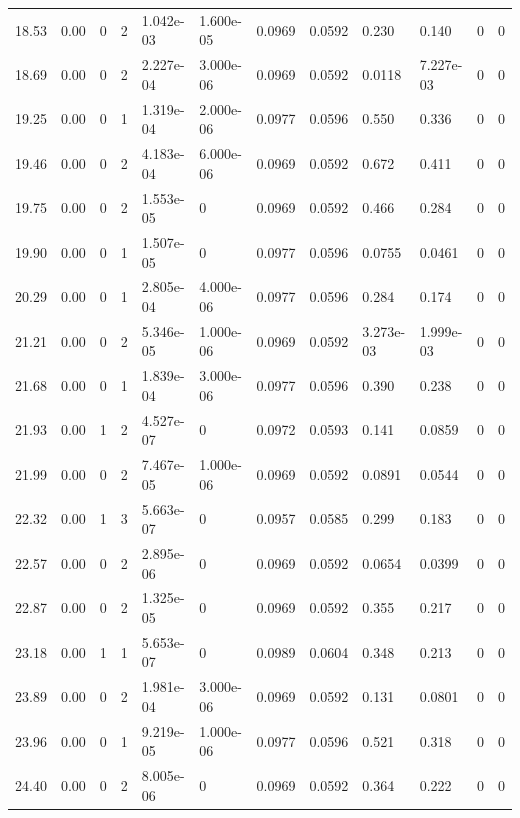 \documentclass[preview]{standalone}
\begin{document}
{{{\begin{tabular}{L{1.2cm}C{1.2cm} C{0.3cm}C{0.5cm} C{1.4cm}C{1.4cm} C{1.4cm}C{1.4cm} C{1.6cm}C{1.6cm} C{1.6cm}C{1.6cm}}
  18.53  &  0.00  & 0     &  2 &  1.042e-03  & 1.600e-05  &  0.0969&   0.0592& 0.230 & 0.140   &  0 & 0  \\ 
  18.69  &  0.00  & 0     &  2 &  2.227e-04  & 3.000e-06  &  0.0969&   0.0592& 0.0118 & 7.227e-03   &  0 & 0  \\ 
  19.25  &  0.00  & 0     &  1 &  1.319e-04  & 2.000e-06  &  0.0977&   0.0596& 0.550 & 0.336   &  0 & 0  \\ 
  19.46  &  0.00  & 0     &  2 &  4.183e-04  & 6.000e-06  &  0.0969&   0.0592& 0.672 & 0.411   &  0 & 0  \\ 
  19.75  &  0.00  & 0     &  2 &  1.553e-05  & 0  &  0.0969&   0.0592& 0.466 & 0.284   &  0 & 0  \\ 
  19.90  &  0.00  & 0     &  1 &  1.507e-05  & 0  &  0.0977&   0.0596& 0.0755 & 0.0461   &  0 & 0  \\ 
  20.29  &  0.00  & 0     &  1 &  2.805e-04  & 4.000e-06  &  0.0977&   0.0596& 0.284 & 0.174   &  0 & 0  \\ 
  21.21  &  0.00  & 0     &  2 &  5.346e-05  & 1.000e-06  &  0.0969&   0.0592& 3.273e-03 & 1.999e-03   &  0 & 0  \\ 
  21.68  &  0.00  & 0     &  1 &  1.839e-04  & 3.000e-06  &  0.0977&   0.0596& 0.390 & 0.238   &  0 & 0  \\ 
  21.93  &  0.00  & 1     &  2 &  4.527e-07  & 0  &  0.0972&   0.0593& 0.141 & 0.0859   &  0 & 0  \\ 
  21.99  &  0.00  & 0     &  2 &  7.467e-05  & 1.000e-06  &  0.0969&   0.0592& 0.0891 & 0.0544   &  0 & 0  \\ 
  22.32  &  0.00  & 1     &  3 &  5.663e-07  & 0  &  0.0957&   0.0585& 0.299 & 0.183   &  0 & 0  \\ 
  22.57  &  0.00  & 0     &  2 &  2.895e-06  & 0  &  0.0969&   0.0592& 0.0654 & 0.0399   &  0 & 0  \\ 
  22.87  &  0.00  & 0     &  2 &  1.325e-05  & 0  &  0.0969&   0.0592& 0.355 & 0.217   &  0 & 0  \\ 
  23.18  &  0.00  & 1     &  1 &  5.653e-07  & 0  &  0.0989&   0.0604& 0.348 & 0.213   &  0 & 0  \\ 
  23.89  &  0.00  & 0     &  2 &  1.981e-04  & 3.000e-06  &  0.0969&   0.0592& 0.131 & 0.0801   &  0 & 0  \\ 
  23.96  &  0.00  & 0     &  1 &  9.219e-05  & 1.000e-06  &  0.0977&   0.0596& 0.521 & 0.318   &  0 & 0  \\ 
  24.40  &  0.00  & 0     &  2 &  8.005e-06  & 0  &  0.0969&   0.0592& 0.364 & 0.222   &  0 & 0  \\ 

\end{tabular}}}}
\end{document}
